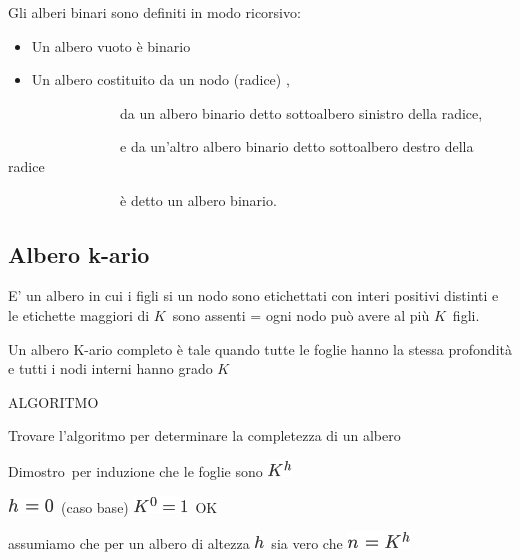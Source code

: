 \documentclass{article}
\providecommand{\tightlist}{%
  \setlength{\itemsep}{0pt}\setlength{\parskip}{0pt}}
\begin{document}
{}

{Gli alberi binari sono definiti in modo ricorsivo:}

\begin{itemize}
\tightlist
\item
  {Un albero vuoto è binario}
\item
  {Un albero costituito da un nodo (radice) ,}
\end{itemize}

{~~~~~~~~~~~~~~~~da un albero binario detto sottoalbero sinistro della
radice,}

{~~~~~~~~~~~~~~~~e da un'altro albero binario detto sottoalbero destro
della radice}

{~~~~~~~~~~~~~~~~è detto un albero binario.}

{}

\hypertarget{h.chua2o837in5}{\subsection{\texorpdfstring{{Albero
k-ario}}{Albero k-ario}}\label{h.chua2o837in5}}

{E' un albero in cui i figli si un nodo sono etichettati con interi
positivi distinti e le etichette maggiori di
}$K${~sono assenti = ogni nodo può
avere al più }$K${~figli.}

{}

{Un albero K-ario completo è tale quando tutte le foglie hanno la stessa
profondità e tutti i nodi interni hanno grado
}$K${~}

{}

{ALGORITMO}

{Trovare l'algoritmo per determinare la completezza di un albero}

{}

{Dimostro}{~per induzione che le foglie sono
}\includegraphics{images/image86.png}{~}

{}

\includegraphics{images/image87.png}{~(caso base)
}\includegraphics{images/image88.png}{~OK}

{assumiamo che per un albero di altezza
}\includegraphics{images/image89.png}{~sia vero che
}\includegraphics{images/image90.png}
\end{document}
